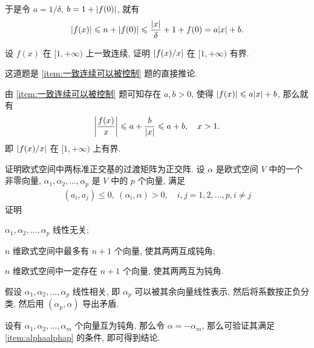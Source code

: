 \begin{exercise}[series=exer]
\begin{answer}
        于是令 $ a = 1/\delta $, $ b = 1 + \abs{f(0)} $, 就有
        \begin{align*}
            \abs{f(x)} \leqslant n + \abs{f(0)} \leqslant \frac{\abs{x}}{\delta} + 1 + f(0) = a\abs{x} + b.
        \end{align*}
    \end{answer}
    \item 设 $ f(x) $ 在 $ [1, +\infty) $ 上一致连续, 证明 $ \abs{f(x)/x} $ 在 $ [1, +\infty) $ 有界.
    \begin{hint}
        这道题是 \ref{item:一致连续可以被控制} 题的直接推论. 
    \end{hint}
    \begin{answer}
        由 \ref{item:一致连续可以被控制} 题可知存在 $ a, b > 0 $, 使得 $ \abs{f(x)} \leqslant a\abs{x} + b $, 那么就有
        \begin{align*}
            \abs{\frac{f(x)}{x}} \leqslant a + \frac{b}{\abs{x}} \leqslant a + b,\quad x > 1.
        \end{align*}
        即 $ \abs{f(x)/x} $ 在 $ [1, +\infty) $ 上有界.
    \end{answer}
    \item 证明欧式空间中两标准正交基的过渡矩阵为正交阵.
    \hitem 设 $ \alpha $ 是欧式空间 $ V $ 中的一个非零向量, $ \alpha_{1}, \alpha_{2}, \dots, \alpha_{p} $ 是 $ V $ 中的 $ p $ 个向量, 满足
    \begin{align*}
        (a_{i}, a_{j}) \le 0,\ (\alpha_{i}, \alpha) > 0, \quad i, j = 1, 2, \dots, p, i \ne j
    \end{align*}
    证明
    \begin{exercise}
        \item\label{item:alphaalphap} $ \alpha_{1}, \alpha_{2}, \dots, \alpha_{p} $ 线性无关;
        \item $ n $ 维欧式空间中最多有 $ n + 1 $ 个向量, 使其两两互成钝角;
        \item $ n $ 维欧式空间中一定存在 $ n + 1 $ 个向量, 使其两两互为钝角.
    \end{exercise}
    \begin{hint}
        \begin{hintsheet}
            \item 假设 $ \alpha_{1}, \alpha_{2}, \dots, \alpha_{p} $ 线性相关, 即 $ \alpha_{p} $ 可以被其余向量线性表示, 然后将系数按正负分类, 然后用 $ (\alpha_{p}, \alpha) $ 导出矛盾.
            \item 设有 $ \alpha_{1}, \alpha_{2}, \dots, \alpha_{m} $ 个向量互为钝角, 那么令 $ \alpha = -\alpha_{m} $, 那么可验证其满足 \ref{item:alphaalphap} 的条件, 即可得到结论. 

\end{hintsheet}
\end{hint}
\end{exercise}
